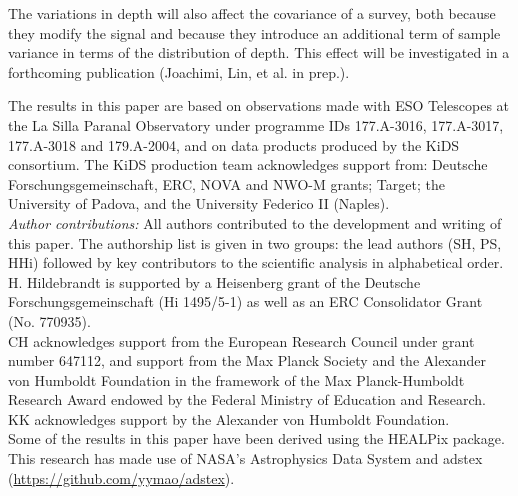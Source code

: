 \documentclass{aa}
\begin{document}
The variations in depth will also affect the covariance of a survey, both because they modify the signal and because they introduce an additional term of sample variance in terms of the distribution of depth. This effect will be investigated in a forthcoming publication (Joachimi, Lin, et al. in prep.).



\begin{acknowledgements}
The results in this paper are based on observations made with ESO Telescopes at the La Silla Paranal Observatory under programme IDs 177.A-3016, 177.A-3017, 177.A-3018 and 179.A-2004, and on data products produced by the KiDS consortium. The KiDS production team acknowledges support from: Deutsche Forschungsgemeinschaft, ERC, NOVA and NWO-M grants; Target; the University of Padova, and the University Federico II (Naples).
\\
\emph{Author contributions:} All authors contributed to the development and writing of this paper. The authorship list is given in two groups: the lead authors (SH, PS, HHi) followed by key contributors to the scientific analysis in alphabetical order.
\\
H. Hildebrandt is supported by a Heisenberg grant of the Deutsche Forschungsgemeinschaft (Hi 1495/5-1) as well as an ERC Consolidator Grant (No. 770935).
\\
CH acknowledges support from the European Research Council under grant number 647112, and support from the Max Planck Society and the Alexander von Humboldt Foundation in the framework of the Max Planck-Humboldt Research Award endowed by the Federal Ministry of Education and Research. 
\\
KK acknowledges support by the Alexander von Humboldt Foundation.
\\
Some of the results in this paper have been derived using the HEALPix \citep{2005ApJ...622..759G} package.
\\
This research has made use of NASA's Astrophysics Data System and adstex (\url{https://github.com/yymao/adstex}).
\end{acknowledgements}
\end{document}
